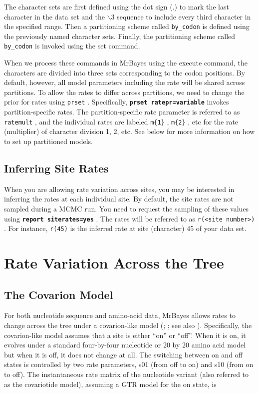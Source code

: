 \documentclass[12pt]{book}
\newcommand{\ttt}[1]{\texttt{#1} }
\newcommand{\tb}[1]{\ttt{\textbf{#1}} }
\begin{document}
The character sets are first defined using the dot sign (.) to mark the last character in the data
set and the $\backslash$3 sequence to include every third character in the specified range. Then a
partitioning scheme called \ttt{by\_codon} is defined using the previously named character sets.
Finally, the partitioning scheme called \ttt{by\_codon} is invoked using the set command.

When we process these commands in MrBayes using the execute command, the characters are divided
into three sets corresponding to the codon positions. By default, however, all model parameters
including the rate will be shared across partitions. To allow the rates to differ across
partitions, we need to change the prior for rates using \ttt{prset}. Specifically, \tb{prset
ratepr=variable} invokes partition-specific rates.  The partition-specific rate parameter is
referred to as \ttt{ratemult}, and the individual rates are labeled \ttt{m\{1\}}, \ttt{m\{2\}}, etc
for the rate (multiplier) of character division 1, 2, etc. See below for more information on how to
set up partitioned models.

\subsection{Inferring Site Rates}
When you are allowing rate variation across sites, you may be interested in inferring the rates at
each individual site. By default, the site rates are not sampled during a MCMC run. You need to
request the sampling of these values using \tb{report siterates=yes}. The rates will be referred to
as \ttt{r(<site number>)}. For instance, \ttt{r(45)} is the inferred rate at site (character) 45 of
your data set.

\section{Rate Variation Across the Tree}

\subsection{The Covarion Model}
For both nucleotide sequence and amino-acid data, MrBayes allows rates to change across the tree
under a covarion-like model (\citet{tuffley98}; \citet{huelsenbeck02a}; see also
\citet{galtier01}). Specifically, the covarion-like model assumes that a site is either ``on'' or
``off''. When it is on, it evolves under a standard four-by-four nucleotide or 20 by 20 amino acid
model but when it is off, it does not change at all. The switching between on and off states is
controlled by two rate parameters, s01 (from off to on) and s10 (from on to off). The instantaneous
rate matrix of the nucleotide variant (also referred to as the covariotide model), assuming a GTR
model for the on state, is
\end{document}
